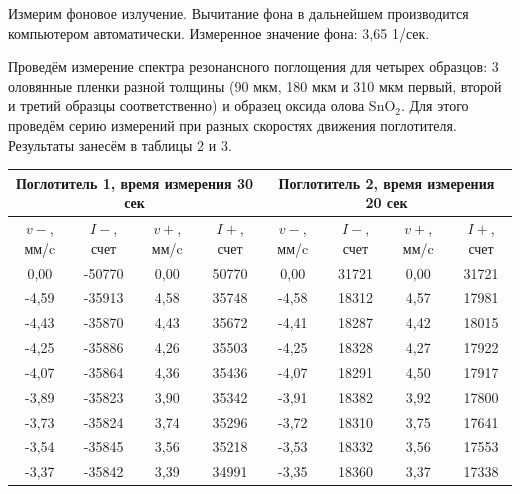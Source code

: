 \documentclass[a4paper,12pt]{article}
\theoremstyle{definition}
\begin{document}
Измерим фоновое излучение. Вычитание фона в дальнейшем производится компьютером автоматически. Измеренное значение фона: 3,65 1/сек.

Проведём измерение спектра резонансного поглощения для четырех образцов: 3 оловянные пленки разной толщины (90 мкм, 180 мкм и 310 мкм первый, второй и третий образцы соответственно) и образец оксида олова SnO$_2$. Для этого проведём серию измерений при разных скоростях движения поглотителя. Результаты занесём в таблицы 2 и 3.



\begin{table}[h]
\begin{tabular}{|c|c|c|c|c|c|c|c|}
\hline
\multicolumn{4}{|c|}{Поглотитель   1, время измерения 30 сек} & \multicolumn{4}{c|}{Поглотитель   2, время измерения 20 сек} \\ \hline
$v-$, мм/c    & $I-$, счет    & $v+$, мм/c    & $I+$, счет    & $v-$, мм/c    & $I-$, счет    & $v+$, мм/c    & $I+$, счет   \\ \hline
0,00          & -50770        & 0,00          & 50770         & 0,00          & 31721         & 0,00          & 31721        \\ \hline
-4,59         & -35913        & 4,58          & 35748         & -4,58         & 18312         & 4,57          & 17981        \\ \hline
-4,43         & -35870        & 4,43          & 35672         & -4,41         & 18287         & 4,42          & 18015        \\ \hline
-4,25         & -35886        & 4,26          & 35503         & -4,25         & 18328         & 4,27          & 17922        \\ \hline
-4,07         & -35864        & 4,36          & 35436         & -4,07         & 18291         & 4,50          & 17917        \\ \hline
-3,89         & -35823        & 3,90          & 35342         & -3,91         & 18382         & 3,92          & 17800        \\ \hline
-3,73         & -35824        & 3,74          & 35296         & -3,72         & 18310         & 3,75          & 17641        \\ \hline
-3,54         & -35845        & 3,56          & 35218         & -3,53         & 18332         & 3,56          & 17553        \\ \hline
-3,37         & -35842        & 3,39          & 34991         & -3,35         & 18360         & 3,37          & 17338        \\ \hline

\end{tabular}
\end{table}
\end{document}

